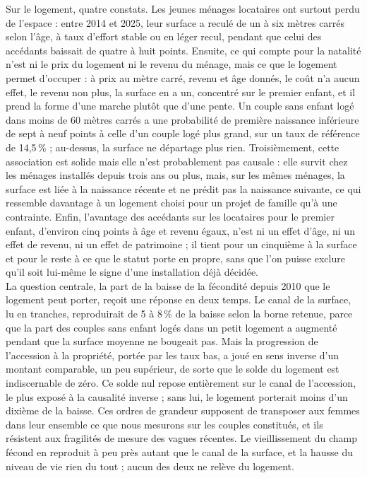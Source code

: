\documentclass[12pt,a4paper]{article}
\begin{document}
\noindent Sur le logement, quatre constats. Les jeunes ménages locataires ont surtout perdu de l'espace : entre 2014 et 2025, leur surface a reculé de un à six mètres carrés selon l'âge, à taux d'effort stable ou en léger recul, pendant que celui des accédants baissait de quatre à huit points. Ensuite, ce qui compte pour la natalité n'est ni le prix du logement ni le revenu du ménage, mais ce que le logement permet d'occuper : à prix au mètre carré, revenu et âge donnés, le coût n'a aucun effet, le revenu non plus, la surface en a un, concentré sur le premier enfant, et il prend la forme d'une marche plutôt que d'une pente. Un couple sans enfant logé dans moins de 60 mètres carrés a une probabilité de première naissance inférieure de sept à neuf points à celle d'un couple logé plus grand, sur un taux de référence de 14,5\,\% ; au-dessus, la surface ne départage plus rien. Troisièmement, cette association est solide mais elle n'est probablement pas causale : elle survit chez les ménages installés depuis trois ans ou plus, mais, sur les mêmes ménages, la surface est liée à la naissance récente et ne prédit pas la naissance suivante, ce qui ressemble davantage à un logement choisi pour un projet de famille qu'à une contrainte. Enfin, l'avantage des accédants sur les locataires pour le premier enfant, d'environ cinq points à âge et revenu égaux, n'est ni un effet d'âge, ni un effet de revenu, ni un effet de patrimoine ; il tient pour un cinquième à la surface et pour le reste à ce que le statut porte en propre, sans que l'on puisse exclure qu'il soit lui-même le signe d'une installation déjà décidée. \\

\noindent La question centrale, la part de la baisse de la fécondité depuis 2010 que le logement peut porter, reçoit une réponse en deux temps. Le canal de la surface, lu en tranches, reproduirait de 5 à 8\,\% de la baisse selon la borne retenue, parce que la part des couples sans enfant logés dans un petit logement a augmenté pendant que la surface moyenne ne bougeait pas. Mais la progression de l'accession à la propriété, portée par les taux bas, a joué en sens inverse d'un montant comparable, un peu supérieur, de sorte que le solde du logement est indiscernable de zéro. Ce solde nul repose entièrement sur le canal de l'accession, le plus exposé à la causalité inverse ; sans lui, le logement porterait moins d'un dixième de la baisse. Ces ordres de grandeur supposent de transposer aux femmes dans leur ensemble ce que nous mesurons sur les couples constitués, et ils résistent aux fragilités de mesure des vagues récentes. Le vieillissement du champ fécond en reproduit à peu près autant que le canal de la surface, et la hausse du niveau de vie rien du tout ; aucun des deux ne relève du logement. \\
\end{document}
